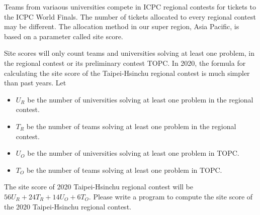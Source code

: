 Teams from variaous universities compete in ICPC regional contests for tickets 
to the ICPC World Finals. The number of tickets allocated to every regional
contest may be different. The allocation method in our super region,
Asia Pacific, is based on a parameter called site score.

Site scores will only count teams and universities solving at least one problem,
in the regional contest or its preliminary contest TOPC.
In 2020, the formula for calculating the site score of the Taipei-Hsinchu 
regional contest is much simpler than past years. Let
\begin{itemize}
\tightlist
\item $U_R$ be the number of universities solving at least one problem in 
the regional contest.
\item $T_R$ be the number of teams solving at least one problem in the regional
contest.
\item $U_O$ be the number of universities solving at least one problem in
TOPC. 
\item $T_O$ be the number of teams solving at least one problem in TOPC. 
\end{itemize}
The site score of 2020 Taipei-Hsinchu regional contest will be 
$56U_R+24T_R+14U_O+6T_O$. 
Please write a program to compute the site score of the 2020 Taipei-Hsinchu 
regional contest. 
